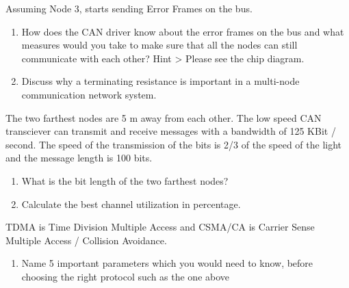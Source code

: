 

Assuming Node 3, starts sending Error Frames on the bus. 
\begin{enumerate}
    \addtocounter{enumi}{7}
    \item How does the CAN driver know about the error frames on the bus and what measures would you take to make sure that all the nodes can still communicate with each other? Hint > Please see the chip diagram.
    \item Discuss why a terminating resistance is important in a multi-node communication network system.
\end{enumerate}

 

The two farthest nodes are 5 m away from each other. The low speed CAN transciever can transmit and receive messages with a bandwidth of 125 KBit / second. The speed of the transmission of the bits is 2/3 of the speed of the light and the message length is 100 bits.

\begin{enumerate}
    \addtocounter{enumi}{9}
    \item What is the bit length of the two farthest nodes? 
    \item Calculate the best channel utilization in percentage.
\end{enumerate}



TDMA is Time Division Multiple Access and CSMA/CA is Carrier Sense Multiple Access / Collision Avoidance. 

\begin{enumerate}
    \addtocounter{enumi}{11}
    \item Name 5 important parameters which you would need to know, before choosing the right protocol such as the one above
\end{enumerate}

